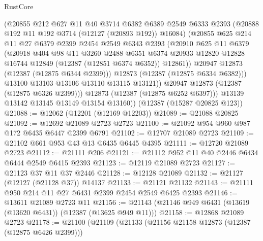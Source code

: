 \begin{lexlean}{RustCore}
\begin{coremodule}
                (@20855
                  @212
                  @627
                  @11
                  @40
                  @3714
                  @6382
                  @6389
                  @2549
                  @6333
                  @2393
                  (@20888 @192 @11 @192 @3714 (@12127 (@20893 @192)) @16084)
                  (@20855
                    @625
                    @214
                    @11
                    @27
                    @6379
                    @2399
                    @2454
                    @2549
                    @6343
                    @2393
                    (@20910
                      @625
                      @11
                      @6379
                      (@20918
                        @404
                        @98
                        @11
                        @3260
                        @2488
                        @6351
                        @6374
                        @20933
                        @12820
                        @12828
                        @16744
                        @12849
                        (@12387 (@12851 @6374 @6352))
                        @12861))
                    @20947
                    @12873
                    (@12387 (@12875 @6344 @2399)))
                  @12873
                  (@12387 (@12875 @6334 @6382)))
                @13100
                @13103
                @13106
                @13110
                @13115
                @13121))
            @20947
            @12873
            (@12387 (@12875 @6326 @2399)))
          @12873
          (@12387 (@12875 @6252 @6397)))
        @13139
        @13142
        @13145
        @13149
        @13154
        @13160))
    (@12387 (@15287 @20825 @123))
@21088 := @12062 (@12201 (@12169 @12203))
@21089 := @21088 @20825
@21092 := @12692 @21089 @2723 @2723
@21100 := @21092 @954 @960 @987 @172 @6435 @6447 @2399 @6791
@21102 := @12707 @21089 @2723
@21109 := @21102 @661 @953 @43 @13 @6435 @6445 @4395
@21111 := @12720 @21089 @2723
@21112 := @21111 @206
@21121 := @21112 @952 @11 @40 @2446 @6434 @6444 @2549 @6415 @2393
@21123 := @12119 @21089 @2723
@21127 := @21123 @37 @11 @37 @2446
@21128 := @12128 @21089
@21132 := @21127 (@12127 (@21128 @37)) @14137
@21133 := @21121 @21132
@21143 := @21111 @950 @214 @11 @27 @6431 @2399 @2454 @2549 @6425 @2393
@21146 := @13611 @21089 @2723 @11
@21156 := @21143 (@21146 @949 @6431 (@13619 (@13620 @6431)) (@12387 (@13625 @949 @11)))
@21158 := @12868 @21089 @2723
@21178 := @21100
    (@21109
      (@21133
        (@21156 @21158 @12873 (@12387 (@12875 @6426 @2399)))

\end{coremodule}
\end{lexlean}
